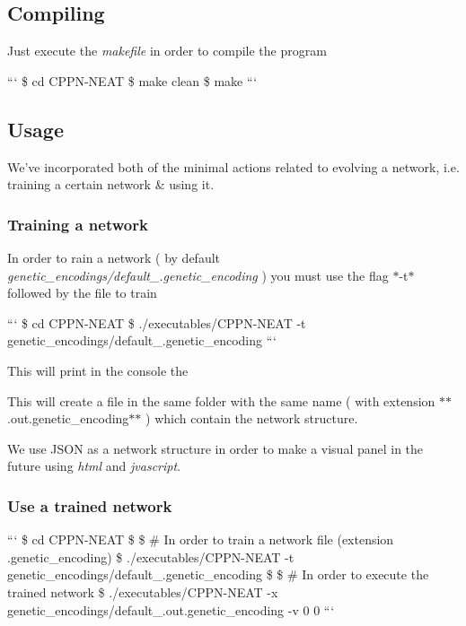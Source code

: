 \subsection*{Compiling}

Just execute the {\itshape makefile} in order to compile the program

``` \$ cd C\-P\-P\-N-\/\-N\-E\-A\-T \$ make clean \$ make ```

\subsection*{Usage}

We've incorporated both of the minimal actions related to evolving a network, i.\-e. training a certain network \& using it.

\subsubsection*{Training a network}

In order to rain a network ( by default {\itshape genetic\-\_\-encodings/default\-\_.\-genetic\-\_\-encoding} ) you must use the flag $\ast$-\/t$\ast$ followed by the file to train

``` \$ cd C\-P\-P\-N-\/\-N\-E\-A\-T \$ ./executables/\-C\-P\-P\-N-\/\-N\-E\-A\-T -\/t genetic\-\_\-encodings/default\-\_.\-genetic\-\_\-encoding ```

This will print in the console the

This will create a file in the same folder with the same name ( with extension $\ast$$\ast$.out.\-genetic\-\_\-encoding$\ast$$\ast$ ) which contain the network structure.


\begin{DoxyItemize}
\item We use J\-S\-O\-N as a network structure in order to make a visual panel in the future using {\itshape html} and {\itshape jvascript}.
\end{DoxyItemize}

\subsubsection*{Use a trained network}

``` \$ cd C\-P\-P\-N-\/\-N\-E\-A\-T \$ \$ \# In order to train a network file (extension .genetic\-\_\-encoding) \$ ./executables/\-C\-P\-P\-N-\/\-N\-E\-A\-T -\/t genetic\-\_\-encodings/default\-\_.\-genetic\-\_\-encoding \$ \$ \# In order to execute the trained network \$ ./executables/\-C\-P\-P\-N-\/\-N\-E\-A\-T -\/x genetic\-\_\-encodings/default\-\_.\-out.\-genetic\-\_\-encoding -\/v 0 0 ``` 